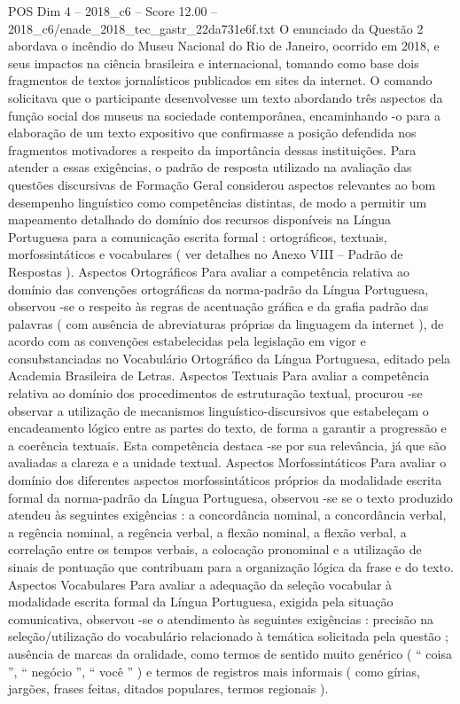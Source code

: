\begin{textsample}{POS Dim 4 – 2018\_c6 – Score 12.00 – 2018\_c6/enade\_2018\_tec\_gastr\_22da731e6f.txt}
O enunciado da Questão 2 abordava o incêndio do Museu Nacional do Rio de Janeiro, ocorrido em 2018, e seus impactos na ciência brasileira e internacional, tomando como base dois fragmentos de textos jornalísticos publicados em sites da internet.
O comando solicitava que o participante desenvolvesse um texto abordando três aspectos da função social dos museus na sociedade contemporânea, encaminhando -o para a elaboração de um texto expositivo que confirmasse a posição defendida nos fragmentos motivadores a respeito da importância dessas instituições.
Para atender a essas exigências, o padrão de resposta utilizado na avaliação das questões discursivas de Formação Geral considerou aspectos relevantes ao bom desempenho linguístico como competências distintas, de modo a permitir um mapeamento detalhado do domínio dos recursos disponíveis na Língua Portuguesa para a comunicação escrita formal : ortográficos, textuais, morfossintáticos e vocabulares ( ver detalhes no Anexo VIII – Padrão de Respostas ).
Aspectos Ortográficos Para avaliar a competência relativa ao domínio das convenções ortográficas da norma-padrão da Língua Portuguesa, observou -se o respeito às regras de acentuação gráfica e da grafia padrão das palavras ( com ausência de abreviaturas próprias da linguagem da internet ), de acordo com as convenções estabelecidas pela legislação em vigor e consubstanciadas no Vocabulário Ortográfico da Língua Portuguesa, editado pela Academia Brasileira de Letras.
Aspectos Textuais Para avaliar a competência relativa ao domínio dos procedimentos de estruturação textual, procurou -se observar a utilização de mecanismos linguístico-discursivos que estabeleçam o encadeamento lógico entre as partes do texto, de forma a garantir a progressão e a coerência textuais.
Esta competência destaca -se por sua relevância, já que são avaliadas a clareza e a unidade textual.
Aspectos Morfossintáticos Para avaliar o domínio dos diferentes aspectos morfossintáticos próprios da modalidade escrita formal da norma-padrão da Língua Portuguesa, observou -se se o texto produzido atendeu às seguintes exigências : a concordância nominal, a concordância verbal, a regência nominal, a regência verbal, a flexão nominal, a flexão verbal, a correlação entre os tempos verbais, a colocação pronominal e a utilização de sinais de pontuação que contribuam para a organização lógica da frase e do texto.
Aspectos Vocabulares Para avaliar a adequação da seleção vocabular à modalidade escrita formal da Língua Portuguesa, exigida pela situação comunicativa, observou -se o atendimento às seguintes exigências : precisão na seleção/utilização do vocabulário relacionado à temática solicitada pela questão ; ausência de marcas da oralidade, como termos de sentido muito genérico ( “ coisa ”, “ negócio ”, “ você ” ) e termos de registros mais informais ( como gírias, jargões, frases feitas, ditados populares, termos regionais ).

\end{textsample}

